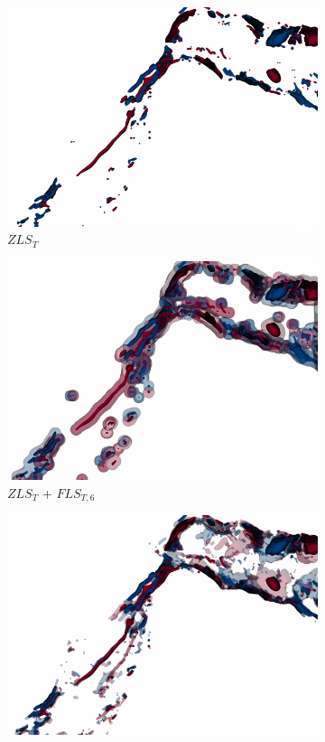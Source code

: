 \begin{figure}[h]
\begin{subfigure}{0.24\linewidth}
\centering
\includegraphics[width=\linewidth]{Images/RedSeaEddy/zls.pdf}
\caption{$ZLS_{T}$}
\label{}
\end{subfigure}
\begin{subfigure}{0.24\linewidth}
\centering
\includegraphics[width=\linewidth]{Images/RedSeaEddy/fls_6.pdf}
\caption{$ZLS_{T}$ + $FLS_{T,6}$}
\label{}
\end{subfigure}
\begin{subfigure}{0.24\linewidth}
\centering
\includegraphics[width=\linewidth]{Images/RedSeaEddy/fcls_68.pdf}

\end{subfigure}
\end{figure}
